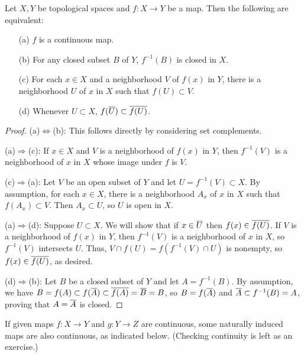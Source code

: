 \begin{thm}
    Let $X, Y$ be topological spaces and $f: X\rightarrow Y$ be a map.
    Then the following are equivalent:
    \begin{enumerate}
        \item[(a)]
        {
            $f$ is a continuous map.
        }
        \item[(b)]
        {
            For any closed subset $B$ of $Y$, $f^{-1}(B)$ is closed in $X$.
        }
        \item[(c)]
        {
            For each $x\in X$ and a neighborhood $V$ of $f(x)$ in $Y$, there is a neighborhood $U$ of $x$ in $X$ such that $f(U)\subset V$.
        }
        \item[(d)]
        {
            Whenever $U\subset X$, $f(\overline{U})\subset\overline{f(U)}$.
        }
    \end{enumerate}
\end{thm}
\begin{proof}
    \hangindent=0.65cm
    (a)$\Leftrightarrow$(b):
        This follows directly by considering set complements.

    \noindent(a)$\Rightarrow$(c):
        If $x\in X$ and $V$ is a neighborhood of $f(x)$ in $Y$, then $f^{-1}(V)$ is a neighborhood of $x$ in $X$ whose image under $f$ is $V$.
    
    \noindent(c)$\Rightarrow$(a):
        Let $V$ be an open subset of $Y$ and let $U=f^{-1}(V)\subset X$.
        By assumption, for each $x\in X$, there is a neighborhood $A_x$ of $x$ in $X$ such that $f(A_x)\subset V$.
        Then $A_x\subset U$, so $U$ is open in $X$.
    
    \noindent(a)$\Rightarrow$(d):
        Suppose $U\subset X$.
        We will show that if $x\in\overline{U}$ then $f(x)\in\overline{f(U)}$.
        If $V$ is a neighborhood of $f(x)$ in $Y$, then $f^{-1}(V)$ is a neighborhood of $x$ in $X$, so $f^{-1}(V)$ intersects $U$.
        Thus, $V\cap f(U)=f(f^{-1}(V)\cap U)$ is nonempty, so $f(x)\in\overline{f(U)}$, as desired.

    \noindent(d)$\Rightarrow$(b):
        Let $B$ be a closed subset of $Y$ and let $A=f^{-1}(B)$.
        By assumption, we have $B=f(A)\subset f(\overline{A})\subset \overline{f(A)}=\overline{B}=B$, so $B=f(\overline{A})$ and $\overline{A}\subset f^{-1}(B)=A$, proving that $A=\overline{A}$ is closed.
\end{proof}

If given maps $f: X\rightarrow Y$ and $g: Y\rightarrow Z$ are continuous, some naturally induced maps are also continuous, as indicated below. \color{brown}(Checking continuity is left as an exercise.)\color{black}


